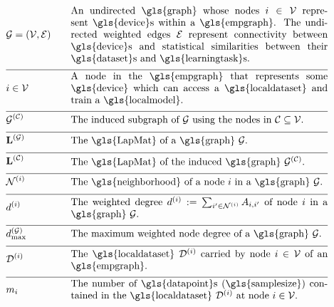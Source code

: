\begin{align}
 	&\graph = \pair{\nodes}{\edges} & \quad & \parbox{.75\textwidth}{An undirected \gls{graph} whose nodes $\nodeidx \in \nodes$ represent 
	\gls{device}s within a \gls{empgraph}. The undirected weighted edges $\edges$ represent connectivity between 
	\gls{device}s and statistical similarities between their \gls{dataset}s and \gls{learningtask}s.}\nonumber \\[2mm] \hline \nonumber\\[-5mm]
&\nodeidx \in \nodes& \quad & \parbox{.75\textwidth}{A node in the \gls{empgraph} that represents some 
	\gls{device} which can access a \gls{localdataset} and train a \gls{localmodel}.}\nonumber \\[2mm] \hline \nonumber\\[-5mm]
	&\indsubgraph{\graph}{\cluster}& \quad & \parbox{.75\textwidth}{The induced subgraph of $\graph$ using the nodes in $\cluster \subseteq \nodes$.} \nonumber \\[2mm] \hline \nonumber\\[-5mm]
	&\LapMat{\graph}   & \quad & \parbox{.75\textwidth}{The \gls{LapMat} of a \gls{graph} $\graph$.}\nonumber \\[2mm] \hline \nonumber\\[-5mm]
		&\LapMat{\cluster}   & \quad & \parbox{.75\textwidth}{The \gls{LapMat} of the induced \gls{graph} $\indsubgraph{\graph}{\cluster}$.} \nonumber \\[2mm] \hline \nonumber\\[-5mm]
	 &		\neighbourhood{\nodeidx}  & \quad & \parbox{.75\textwidth}{The \gls{neighborhood} of a node $\nodeidx$ in a \gls{graph} $\graph$.}   \nonumber \\[2mm] \hline \nonumber\\[-5mm]
	&\nodedegree{\nodeidx} & \quad & \parbox{.75\textwidth}{The weighted degree $\nodedegree{\nodeidx}\defeq \sum_{\nodeidx' \in \neighbourhood{\nodeidx}} \edgeweight_{\nodeidx,\nodeidx'}$ of node $\nodeidx$ in a \gls{graph} $\graph$.}  \nonumber \\[2mm] \hline \nonumber\\[-5mm]
	&\maxnodedegree^{(\graph)} & \quad & \parbox{.75\textwidth}{The maximum weighted node degree of a \gls{graph} $\graph$.} \nonumber \\[2mm] \hline \nonumber\\[-5mm] 
&\localdataset{\nodeidx} & \quad & \parbox{.75\textwidth}{The \gls{localdataset} $\localdataset{\nodeidx}$ carried by 
			node $\nodeidx\in \nodes$ of an \gls{empgraph}.} \nonumber \\[2mm] \hline \nonumber\\[-5mm]
&\localsamplesize{\nodeidx} & \quad & \parbox{.75\textwidth}{The number of \gls{datapoint}s (\gls{samplesize}) contained in the 
			\gls{localdataset} $\localdataset{\nodeidx}$ at node $\nodeidx\in \nodes$.} \nonumber 
\end{align} 

